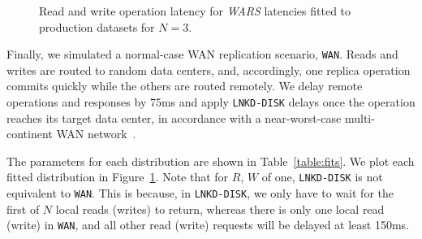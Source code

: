 \documentclass{vldb}
\begin{document}
\begin{figure}[t!]
\caption{Read and write operation latency for \textit{WARS} latencies fitted
  to production datasets for $N$$=$$3$.}
\label{fig:latencies}
\end{figure}

Finally, we simulated a normal-case WAN replication scenario,
\texttt{WAN}.  Reads and writes are routed to random data centers,
and, accordingly, one replica operation commits quickly while the
others are routed remotely.  We delay remote operations and responses
by 75ms and apply \texttt{LNKD-DISK} delays once the operation reaches its
target data center, in accordance with a near-worst-case
multi-continent WAN network~\cite{dean-keynote}.

The parameters for each distribution are shown in Table~\ref{table:fits}. We plot each fitted distribution in Figure~\ref{fig:latencies}.  Note
that for $R$, $W$ of one, \texttt{LNKD-DISK} is not equivalent to
\texttt{WAN}.  This is because, in \texttt{LNKD-DISK}, we only have to wait
for the first of $N$ local reads (writes) to return, whereas there is
only one local read (write) in \texttt{WAN}, and all other read
(write) requests will be delayed at least 150ms.
\end{document}
